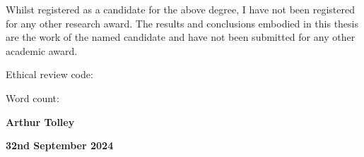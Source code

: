 Whilst registered as a candidate for the above degree, I have not been registered for any other research award. The results and conclusions embodied in this thesis are the work of the named candidate and have not been submitted for any other academic award.

\vspace{\baselineskip}
\noindent Ethical review code: 

\vspace{\baselineskip}
\noindent Word count:   

\noindent\hrulefill

\vspace{\baselineskip}
\noindent \textbf{Arthur Tolley}

\noindent \textbf{32nd September 2024}